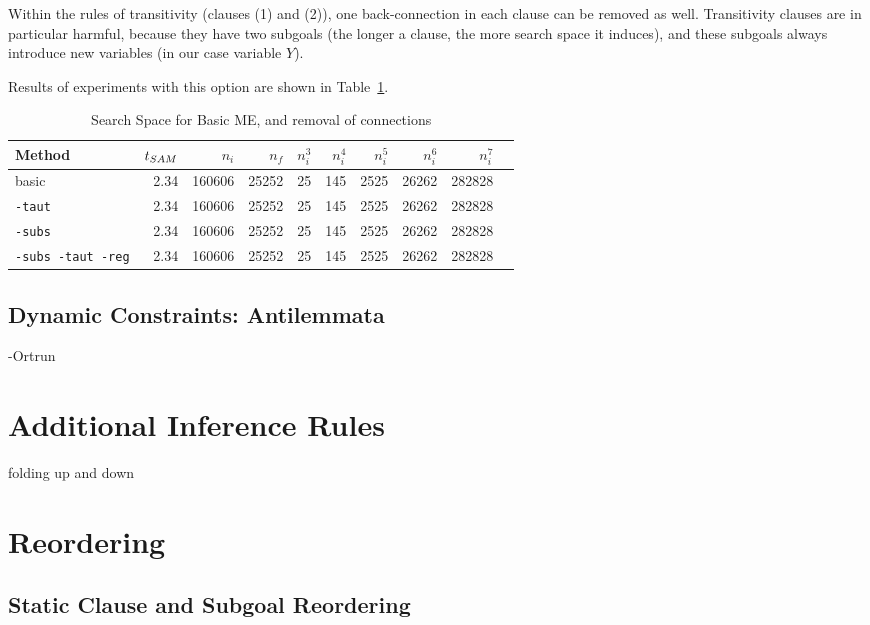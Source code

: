 Within the rules of transitivity (clauses (1) and (2)), one
back-connection in each clause can be removed as well. 
Transitivity clauses are in particular harmful, because they have two
subgoals (the longer a clause, the more search space it induces), and
these subgoals always introduce new variables (in our case variable $Y$).

Results of experiments with this option are shown in
Table~\ref{tab:tut2:results.linksubs}.

\begin{table}[htb]
\begin{center}
\begin{tabular}{|l|r|r||r|r||r|r|r|r|r|}
\hline
Method & $t_{SAM}$ & $n_i$ & $n_f$ & 
	$n_i^3$ & $n_i^4$ & $n_i^5$ & $n_i^6$ & $n_i^7$ \\
\hline\hline
basic & 2.34 & 160606 & 25252 &
	25 & 145 & 2525 & 26262 & 282828 \\
\hline
{\tt -taut} & 2.34 & 160606 & 25252 &
	25 & 145 & 2525 & 26262 & 282828 \\
\hline
{\tt -subs} & 2.34 & 160606 & 25252 &
	25 & 145 & 2525 & 26262 & 282828 \\
\hline
{\tt -subs -taut -reg} & 2.34 & 160606 & 25252 &
	25 & 145 & 2525 & 26262 & 282828 \\
\hline\hline
\end{tabular}
\end{center}
\caption{Search Space for Basic ME, and removal of connections}
\label{tab:tut2:results.linksubs}
\end{table}


\subsection{Dynamic Constraints: Antilemmata}

-Ortrun

\section{Additional Inference Rules}

folding up and down

\section{Reordering}
\subsection{Static Clause and Subgoal Reordering}

